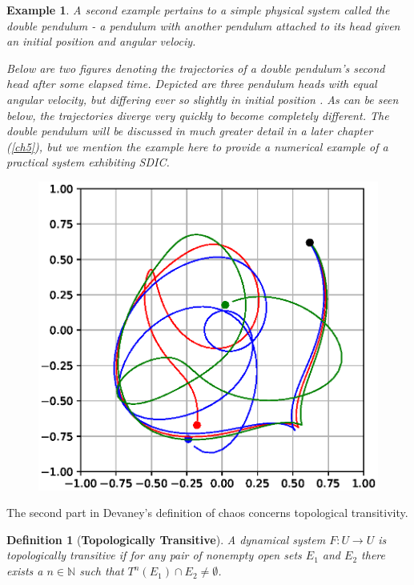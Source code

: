 \documentclass[a4paper,12pt,twoside]{report}
\newtheorem{Definition}{Definition}[]
\newtheorem{Example}{Example}[]
\begin{document}
\begin{Example}
  A second example pertains to a simple physical system called the double pendulum - a pendulum with another pendulum attached to its head given an initial position and angular velociy.  
  
  Below are two figures denoting the trajectories of a double pendulum's second head after some elapsed time. Depicted are three pendulum heads with equal angular velocity, but differing ever so slightly in initial position . As can be seen below, the trajectories diverge very quickly to become completely different. 
  The double pendulum will be discussed in much greater detail in a later chapter (\ref{ch5}), but we mention the example here to provide a numerical example of a practical system exhibiting SDIC.

\begin{figure}[ht]
  \centering
\includegraphics[scale=0.8]{_dp_sdic.eps}
    \label{fig:dp_sdic}
  \end{figure}

\end{Example}


The second part in Devaney's definition of chaos concerns topological transitivity.

\begin{Definition}
  [\bf {Topologically Transitive}]\label{Dfn_TopolTrans}\rm
	A dynamical system $F: U \to U$ is topologically transitive if for any pair of nonempty open sets $E_1$ and $E_2$ there exists a $n\in\mathbb{N}$ such that $T^n(E_1) \cap E_2 \not= \emptyset$. 
\end{Definition}
\end{document}
